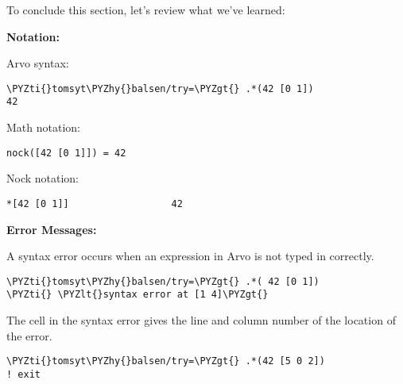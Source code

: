 \label{sec:getting_started_summary}

To conclude this section, let's review what we've learned:

\textbf{Notation:}

Arvo syntax:

\begin{framed_shaded}
\begin{Verbatim}[fontsize=\relsize{-2.5},commandchars=\\\{\}]
\PYZti{}tomsyt\PYZhy{}balsen/try=\PYZgt{} .*(42 [0 1])
42
\end{Verbatim}
\end{framed_shaded}

Math notation:

\begin{framed_shaded}
\begin{Verbatim}[fontsize=\relsize{-2.5},commandchars=\\\{\}]
nock([42 [0 1]]) = 42
\end{Verbatim}
\end{framed_shaded}

Nock notation:

\begin{framed_shaded}
\begin{Verbatim}[fontsize=\relsize{-2.5},commandchars=\\\{\}]
*[42 [0 1]]                  42
\end{Verbatim}
\end{framed_shaded}

\textbf{Error Messages:}

A syntax error occurs when an expression in Arvo is not typed in correctly.

\begin{framed_shaded}
\begin{Verbatim}[fontsize=\relsize{-2.5},commandchars=\\\{\}]
\PYZti{}tomsyt\PYZhy{}balsen/try=\PYZgt{} .*( 42 [0 1])
\PYZti{} \PYZlt{}syntax error at [1 4]\PYZgt{}
\end{Verbatim}
\end{framed_shaded}

The cell in the syntax error gives the line and column number of the location of the error.

\begin{framed_shaded}
\begin{Verbatim}[fontsize=\relsize{-2.5},commandchars=\\\{\}]
\PYZti{}tomsyt\PYZhy{}balsen/try=\PYZgt{} .*(42 [5 0 2])
! exit
\end{Verbatim}
\end{framed_shaded}

